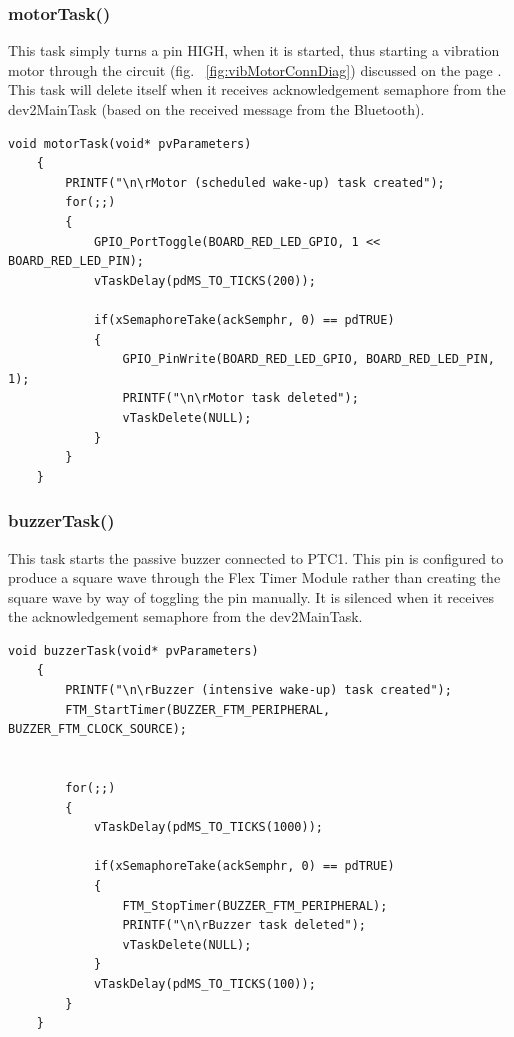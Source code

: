 \documentclass[12pt,a4paper]{article}
\begin{document}
    \subsubsection*{motorTask()}
    This task simply turns a pin HIGH, when it is started, thus starting a vibration motor through the circuit (fig. ~\ref{fig:vibMotorConnDiag}) discussed on the page \pageref{fig:vibMotorConnDiag}. This task will delete itself when it receives acknowledgement semaphore from the dev2MainTask (based on the received message from the Bluetooth).

    \begin{lstlisting}[label={lst:motorTask}, caption=motorTask() task]
    void motorTask(void* pvParameters)
    {
        PRINTF("\n\rMotor (scheduled wake-up) task created");
        for(;;)
        {
            GPIO_PortToggle(BOARD_RED_LED_GPIO, 1 << BOARD_RED_LED_PIN);
            vTaskDelay(pdMS_TO_TICKS(200));

            if(xSemaphoreTake(ackSemphr, 0) == pdTRUE)
            {
                GPIO_PinWrite(BOARD_RED_LED_GPIO, BOARD_RED_LED_PIN, 1);
                PRINTF("\n\rMotor task deleted");
                vTaskDelete(NULL);
            }
        }
    }
    \end{lstlisting}
    
    \subsubsection*{buzzerTask()}
    This task starts the passive buzzer connected to PTC1. This pin is configured to produce a square wave through the Flex Timer Module rather than creating the square wave by way of toggling the pin manually. It is silenced when it receives the acknowledgement semaphore from the dev2MainTask.
    \begin{lstlisting}[label={lst:buzzerTask}, caption=buzzerTask()]
     void buzzerTask(void* pvParameters)
    {
        PRINTF("\n\rBuzzer (intensive wake-up) task created");
        FTM_StartTimer(BUZZER_FTM_PERIPHERAL, BUZZER_FTM_CLOCK_SOURCE);

        
        for(;;)
        {
            vTaskDelay(pdMS_TO_TICKS(1000));

            if(xSemaphoreTake(ackSemphr, 0) == pdTRUE)
            {
                FTM_StopTimer(BUZZER_FTM_PERIPHERAL);
                PRINTF("\n\rBuzzer task deleted");
                vTaskDelete(NULL);
            }
            vTaskDelay(pdMS_TO_TICKS(100));
        }
    }
    \end{lstlisting}
\end{document}
